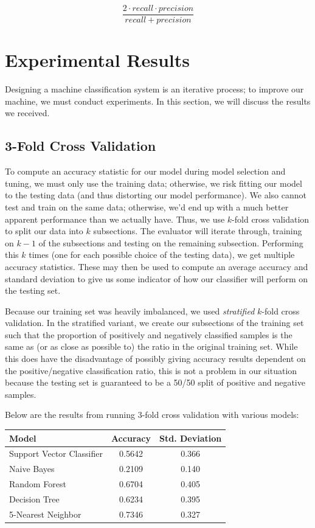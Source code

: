 \documentclass{article} %
\begin{document}
\[\frac{2\cdot recall\cdot precision}{recall+precision}\]

\section{Experimental Results}
Designing a machine classification system is an iterative process; to improve our machine, we must conduct experiments.  In this section, we will discuss the results we received. 

\subsection{3-Fold Cross Validation}
To compute an accuracy statistic for our model during model selection and tuning, we must only use the training data; otherwise, we risk fitting our model to the testing data (and thus distorting our model performance).  We also cannot test and train on the same data; otherwise, we'd end up with a much better apparent performance than we actually have.  Thus, we use $k$-fold cross validation to split our data into $k$ subsections.  The evaluator will iterate through, training on $k-1$ of the subsections and testing on the remaining subsection.  Performing this $k$ times (one for each possible choice of the testing data), we get multiple accuracy statistics.  These may then be used to compute an average accuracy and standard deviation to give us some indicator of how our classifier will perform on the testing set.

Because our training set was heavily imbalanced, we used \textit{stratified} $k$-fold cross validation.  In the stratified variant, we create our subsections of the training set such that the proportion of positively and negatively classified samples is the same as (or as close as possible to) the ratio in the original training set.  While this does have the disadvantage of possibly giving accuracy results dependent on the positive/negative classification ratio, this is not a problem in our situation because the testing set is guaranteed to be a 50/50 split of positive and negative samples.

Below are the results from running $3$-fold cross validation with various models:

\begin{center}\begin{tabular}{|l|cc|}\hline
	\textbf{Model} & \textbf{Accuracy} & \textbf{Std. Deviation} \\\hline
	Support Vector Classifier & 0.5642 & 0.366 \\
	Naive Bayes & 0.2109 & 0.140 \\
	Random Forest & 0.6704 & 0.405 \\
	Decision Tree & 0.6234 & 0.395 \\
	5-Nearest Neighbor & 0.7346 & 0.327 \\\hline
\end{tabular}\end{center}
\end{document}
